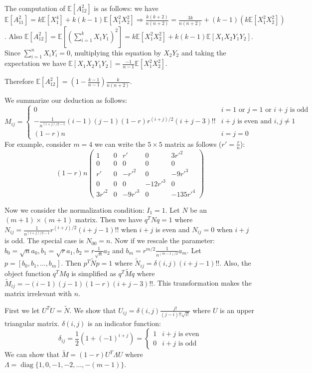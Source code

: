 \documentclass{article}
\def\E{\mathbb{E}}
\DeclareMathOperator*{\diag}{diag}
\begin{document}
The computation of $\E[A^2_{12}]$ is as follows:
we have $\E[A_{11}^2] = k\E[X_1^4] + k(k-1)\E[X_1^2 X_2^2] \Rightarrow
\frac{k(k+2)}{n(n+2)} = \frac{3k}{n(n+2)} + (k-1) (k \E[X_1^2 X_2^2])$.
Also $\E[A_{12}^2] = \E[(\sum_{i=1}^k X_1 Y_1)^2]
= k \E[X_1^2X^2_2] + k(k-1)\E[X_1X_2Y_1Y_2]
$.
Since $\sum_{i=1}^n X_i Y_i = 0$, multiplying this equation by $X_2Y_2$ and taking the expectation
we have $\E[X_1X_2Y_1Y_2] = \frac{-1}{n-1} \E[X_1^2 X_2^2]$.

Therefore $\E[A^2_{12}]=(1-\frac{k-1}{n-1}) \frac{k}{n(n+2)}$.

We summarize our deduction as follows:
\begin{equation}
M_{ij} = \begin{cases} 0 & i=1 \textrm{ or } j=1 \textrm{ or } i + j
\textrm{ is odd} \\
 -\frac{1}{n^{(i+j)/2-1}}(i-1)(j-1) (1-r)r^{(i+j)/ 2 } (i+j-3)!! & i+j
 \textrm{ is even and } i,j \neq 1 \\
(1-r)n & i=j=0
\end{cases}
\end{equation}
For example, consider $m = 4$
we can write the $ 5 \times 5 $ matrix as follows ($r'=\frac{r}{n}$):
$$
(1-r)n\begin{pmatrix}
1 & 0 & r'  & 0 & 3r'^2\\
0 & 0 & 0  & 0 & 0\\
r' &  0 & - r'^2 & 0 & -9 r'^3 \\
0 & 0 & 0 & -12r'^3 & 0 \\
3r'^2 & 0 & -9 r'^3 & 0 & -135r'^4
\end{pmatrix}
$$

Now we consider the normalization condition: $I_1 = 1$.
Let $N$ be an $(m+1) \times (m+1)$ matrix.
Then we have $q^T N q = 1$ where
$N_{ij} =\frac{1}{n^{(i+j)/2-1}}r^{(i+j) / 2} (i+j -1)!!$
when $i+j$ is even and $N_{ij} = 0$
when $i+j$ is odd.
The special case is $N_{00} = n$.
Now if we rescale the parameter:
$b_0 =  \sqrt{n}a_0, b_1 = \sqrt{r} a_1, b_2 = r \frac{1}{\sqrt{n}}a_2$
and $b_m = r^{m/2} \frac{1}{n^{(m-1)/2}}a_m$.
Let $p = [b_0, b_1, \dots, b_m]$.
Then $p^T \widetilde{N} p =1$ where
$\widetilde{N}_{ij} = \delta(i,j) (i+j -1)!!$.
Also, the object function $q^T M q$ is simplified as $q^T \widetilde{M} q$
where $\widetilde{M}_{ij} =  -(i-1)(j-1)(1-r) (i+j-3)!! $.
This transformation makes the matrix irrelevant with $n$.

First we let $U^T U = \widetilde{N}$.
We show that $U_{ij} = \delta(i,j)\frac{j!}{(j-i)!!\sqrt{i!}}$
where $U$ is an upper triangular matrix.
$\delta(i,j)$ is an indicator function:
\begin{equation}
\delta_{ij} = \frac{1}{2}(1+(-1)^{i+j})=\begin{cases}
1 & i+j \textrm{ is even} \\
0 & i+j \textrm{ is odd}
\end{cases}
\end{equation}
We can show that $\widetilde{M} = (1-r)U^T \Lambda U$ where
$\Lambda = \diag\{1,0, -1, -2, \dots, -(m-1)\}$.
\end{document}
